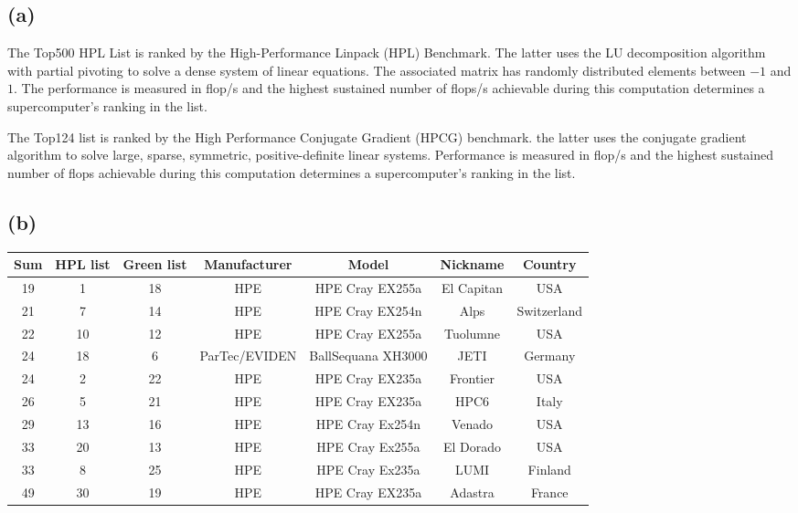 \subsection*{(a)}
The Top500 HPL List is ranked by the High-Performance Linpack (HPL) Benchmark. The latter uses the LU decomposition algorithm with partial pivoting to solve a dense system of linear equations. The associated matrix has randomly distributed elements between $-1$ and $1$. The performance is measured in flop/s and the highest sustained number of flops/s achievable during this computation determines a supercomputer's ranking in the list.

The Top124 list is ranked by the High Performance Conjugate Gradient (HPCG) benchmark. the latter uses the conjugate gradient algorithm to solve large, sparse, symmetric, positive-definite linear systems. Performance is measured in flop/s and the highest sustained number of flops achievable during this computation determines a supercomputer's ranking in the list.

\subsection*{(b)}

\begin{tabular}{|c|c|c|c|c|c|c|}
Sum & HPL list & Green list & Manufacturer & Model & Nickname & Country \\ 
\hline 
19 & 1 & 18 & HPE & HPE Cray EX255a & El Capitan & USA \\ 
\hline 
21 & 7 & 14 & HPE & HPE Cray EX254n & Alps & Switzerland \\ 
\hline 
22 & 10 & 12 & HPE & HPE Cray EX255a & Tuolumne & USA \\ 
\hline 
24 & 18 & 6 & ParTec/EVIDEN & BallSequana XH3000 & JETI & Germany \\ 
\hline 
24 & 2 & 22 & HPE & HPE Cray EX235a & Frontier & USA \\ 
\hline 
26 & 5 & 21 & HPE & HPE Cray EX235a & HPC6 & Italy \\ 
\hline 
29 & 13 & 16 & HPE & HPE Cray Ex254n & Venado & USA \\ 
\hline 
33 & 20 & 13 & HPE & HPE Cray Ex255a & El Dorado & USA \\ 
\hline 
33 & 8 & 25 & HPE & HPE Cray Ex235a & LUMI & Finland \\ 
\hline 
49 & 30 & 19 & HPE & HPE Cray EX235a & Adastra & France \\ 
\hline 
\end{tabular} 


